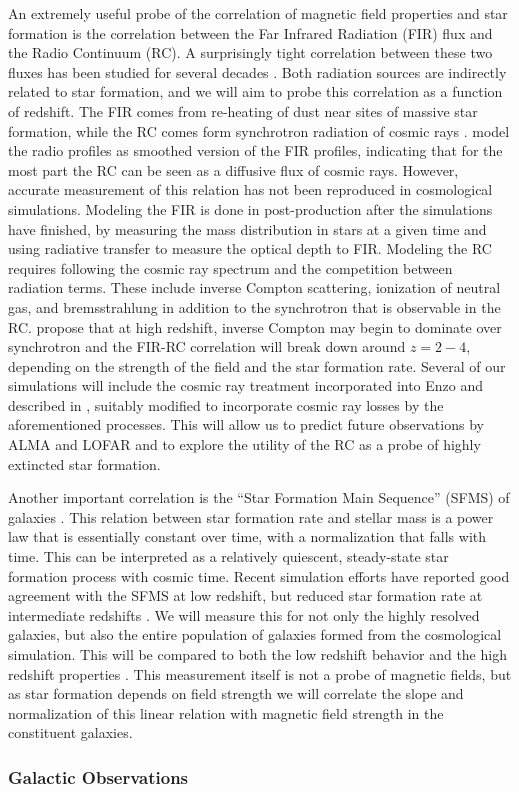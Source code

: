 An extremely useful probe of the correlation of magnetic field properties and
star formation is the
correlation between the Far Infrared Radiation (FIR) flux and the
Radio Continuum (RC).  A surprisingly tight correlation between these
two fluxes has been studied for several decades \citep{Helou85}.  Both
radiation sources are indirectly related to star formation, and we
will aim to probe this correlation as a function of redshift.  The FIR
comes from re-heating of dust near sites of massive star formation,
while the RC comes form synchrotron radiation of cosmic rays
\citep{Helou93,Niklas97}.  \cite{Murphy06} model the radio profiles
as smoothed version of the FIR profiles, indicating that for the most
part the RC can be seen as a diffusive flux of cosmic rays.  However,
accurate measurement of this relation has not been reproduced in
cosmological simulations.  Modeling the FIR is done in post-production
after the simulations have finished, by measuring the mass
distribution in stars at a given time and using radiative transfer to
measure the optical depth to FIR.  Modeling the RC requires following
the cosmic ray spectrum and the competition between radiation terms.
These include inverse Compton scattering, ionization of neutral gas,
and bremsstrahlung in addition to the synchrotron that is observable in the RC.  \cite{Schleicher13b} propose that at high
redshift, inverse Compton may begin to dominate over synchrotron and the FIR-RC
correlation will break down around $z= 2-4$, depending on the strength
of the field and the star formation rate.  Several of our simulations
will include the cosmic ray treatment incorporated into Enzo and
described in \cite{Salem14,Salem14b}, suitably modified to incorporate
cosmic ray losses by the aforementioned processes.  This will allow us
to predict future observations by ALMA and LOFAR and to explore the
utility of the RC as a probe of highly extincted star formation.

Another important correlation is the ``Star Formation Main Sequence''
(SFMS) of galaxies \cite{Daddi07, Speagle14}. This relation
between star formation rate and stellar mass is a power law that is
essentially constant over time, with a normalization that falls with
time.  This can be interpreted as a relatively quiescent, steady-state
star formation process with cosmic time.  Recent simulation efforts
have reported good agreement with the SFMS at low redshift, but
reduced star formation rate at intermediate redshifts
\citep{Sparre15}.  We will measure this for not only the highly
resolved galaxies, but also the entire population of galaxies formed
from the cosmological simulation.  This will be compared to both the
low redshift behavior \cite{Brinchmann04} and the high redshift
properties \cite{Daddi07}.  This measurement itself is not a probe of magnetic
fields, but as star formation depends on field strength we will
correlate the slope and normalization of this linear relation with
magnetic field strength in the constituent galaxies.

\vspace{-3mm}
\subsubsection{Galactic Observations}
\vspace{-2mm}


